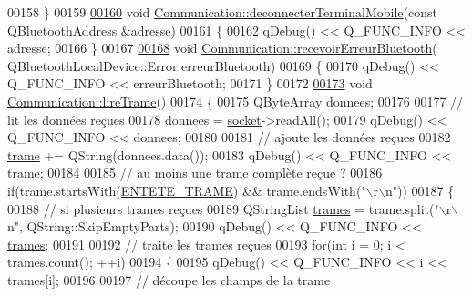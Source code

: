 \begin{DoxyCode}
00158 \}
00159 
\hyperlink{class_communication_aeeb47bc3c4d7419fefb737168638442e}{00160} \textcolor{keywordtype}{void} \hyperlink{class_communication_aeeb47bc3c4d7419fefb737168638442e}{Communication::deconnecterTerminalMobile}(\textcolor{keyword}{const} 
      QBluetoothAddress &adresse)
00161 \{
00162     qDebug() << Q\_FUNC\_INFO << adresse;
00166 \}
00167 
\hyperlink{class_communication_adbbab5630096d6374c4d7e52508b8a37}{00168} \textcolor{keywordtype}{void} \hyperlink{class_communication_adbbab5630096d6374c4d7e52508b8a37}{Communication::recevoirErreurBluetooth}(
      QBluetoothLocalDevice::Error erreurBluetooth)
00169 \{
00170     qDebug() << Q\_FUNC\_INFO << erreurBluetooth;
00171 \}
00172 
\hyperlink{class_communication_ad99afe857470e6e95432b3adcb97fea2}{00173} \textcolor{keywordtype}{void} \hyperlink{class_communication_ad99afe857470e6e95432b3adcb97fea2}{Communication::lireTrame}()
00174 \{
00175     QByteArray donnees;
00176 
00177     \textcolor{comment}{// lit les données reçues}
00178     donnees = \hyperlink{class_communication_aa4ddc3151b305db0135d5826384645cc}{socket}->readAll();
00179     qDebug() << Q\_FUNC\_INFO << donnees;
00180 
00181     \textcolor{comment}{// ajoute les données reçues}
00182     \hyperlink{class_communication_ac8f5004bfaaf7f538ba5ae93255f772b}{trame} += QString(donnees.data());
00183     qDebug() << Q\_FUNC\_INFO << \hyperlink{class_communication_ac8f5004bfaaf7f538ba5ae93255f772b}{trame};
00184 
00185     \textcolor{comment}{// au moins une trame complète reçue ?}
00186     \textcolor{keywordflow}{if}(trame.startsWith(\hyperlink{_communication_8h_a226742d7ade287673fb2295df90f462b}{ENTETE\_TRAME}) && trame.endsWith(\textcolor{stringliteral}{"\(\backslash\)r\(\backslash\)n"}))
00187     \{
00188         \textcolor{comment}{// si plusieurs trames reçues}
00189         QStringList \hyperlink{class_communication_a89b75dc8f2d3427478660b45c01f4186}{trames} = trame.split(\textcolor{stringliteral}{"\(\backslash\)r\(\backslash\)n"}, QString::SkipEmptyParts);
00190         qDebug() << Q\_FUNC\_INFO << \hyperlink{class_communication_a89b75dc8f2d3427478660b45c01f4186}{trames};
00191 
00192         \textcolor{comment}{// traite les trames reçues}
00193         \textcolor{keywordflow}{for}(\textcolor{keywordtype}{int} i = 0; i < trames.count(); ++i)
00194         \{
00195             qDebug() << Q\_FUNC\_INFO << i << trames[i];
00196 
00197             \textcolor{comment}{// découpe les champs de la trame}

\end{DoxyCode}
